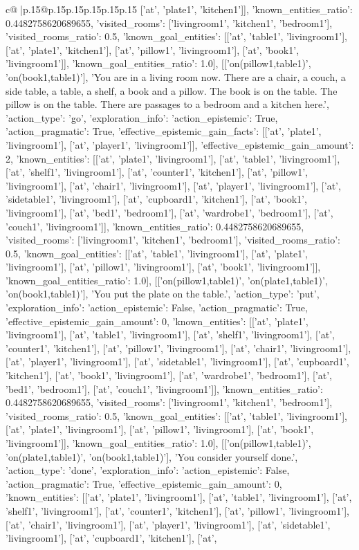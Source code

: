 \documentclass{article}
\begin{document}
{\begin{supertabular}{c@{$\;$}|p{.15\linewidth}@{}p{.15\linewidth}p{.15\linewidth}p{.15\linewidth}p{.15\linewidth}p{.15\linewidth}}
{{{['at', 'plate1', 'kitchen1']], 'known_entities_ratio': 0.4482758620689655, 'visited_rooms': ['livingroom1', 'kitchen1', 'bedroom1'], 'visited_rooms_ratio': 0.5, 'known_goal_entities': [['at', 'table1', 'livingroom1'], ['at', 'plate1', 'kitchen1'], ['at', 'pillow1', 'livingroom1'], ['at', 'book1', 'livingroom1']], 'known_goal_entities_ratio': 1.0}}], [['on(pillow1,table1)', 'on(book1,table1)'], 'You are in a living room now. There are a chair, a couch, a side table, a table, a shelf, a book and a pillow. The book is on the table. The pillow is on the table. There are passages to a bedroom and a kitchen here.\n', {'action_type': 'go', 'exploration_info': {'action_epistemic': True, 'action_pragmatic': True, 'effective_epistemic_gain_facts': [['at', 'plate1', 'livingroom1'], ['at', 'player1', 'livingroom1']], 'effective_epistemic_gain_amount': 2, 'known_entities': [['at', 'plate1', 'livingroom1'], ['at', 'table1', 'livingroom1'], ['at', 'shelf1', 'livingroom1'], ['at', 'counter1', 'kitchen1'], ['at', 'pillow1', 'livingroom1'], ['at', 'chair1', 'livingroom1'], ['at', 'player1', 'livingroom1'], ['at', 'sidetable1', 'livingroom1'], ['at', 'cupboard1', 'kitchen1'], ['at', 'book1', 'livingroom1'], ['at', 'bed1', 'bedroom1'], ['at', 'wardrobe1', 'bedroom1'], ['at', 'couch1', 'livingroom1']], 'known_entities_ratio': 0.4482758620689655, 'visited_rooms': ['livingroom1', 'kitchen1', 'bedroom1'], 'visited_rooms_ratio': 0.5, 'known_goal_entities': [['at', 'table1', 'livingroom1'], ['at', 'plate1', 'livingroom1'], ['at', 'pillow1', 'livingroom1'], ['at', 'book1', 'livingroom1']], 'known_goal_entities_ratio': 1.0}}], [['on(pillow1,table1)', 'on(plate1,table1)', 'on(book1,table1)'], 'You put the plate on the table.\n', {'action_type': 'put', 'exploration_info': {'action_epistemic': False, 'action_pragmatic': True, 'effective_epistemic_gain_amount': 0, 'known_entities': [['at', 'plate1', 'livingroom1'], ['at', 'table1', 'livingroom1'], ['at', 'shelf1', 'livingroom1'], ['at', 'counter1', 'kitchen1'], ['at', 'pillow1', 'livingroom1'], ['at', 'chair1', 'livingroom1'], ['at', 'player1', 'livingroom1'], ['at', 'sidetable1', 'livingroom1'], ['at', 'cupboard1', 'kitchen1'], ['at', 'book1', 'livingroom1'], ['at', 'wardrobe1', 'bedroom1'], ['at', 'bed1', 'bedroom1'], ['at', 'couch1', 'livingroom1']], 'known_entities_ratio': 0.4482758620689655, 'visited_rooms': ['livingroom1', 'kitchen1', 'bedroom1'], 'visited_rooms_ratio': 0.5, 'known_goal_entities': [['at', 'table1', 'livingroom1'], ['at', 'plate1', 'livingroom1'], ['at', 'pillow1', 'livingroom1'], ['at', 'book1', 'livingroom1']], 'known_goal_entities_ratio': 1.0}}], [['on(pillow1,table1)', 'on(plate1,table1)', 'on(book1,table1)'], 'You consider yourself done.\n', {'action_type': 'done', 'exploration_info': {'action_epistemic': False, 'action_pragmatic': True, 'effective_epistemic_gain_amount': 0, 'known_entities': [['at', 'plate1', 'livingroom1'], ['at', 'table1', 'livingroom1'], ['at', 'shelf1', 'livingroom1'], ['at', 'counter1', 'kitchen1'], ['at', 'pillow1', 'livingroom1'], ['at', 'chair1', 'livingroom1'], ['at', 'player1', 'livingroom1'], ['at', 'sidetable1', 'livingroom1'], ['at', 'cupboard1', 'kitchen1'], ['at', }}}
\end{supertabular}}
\end{document}
